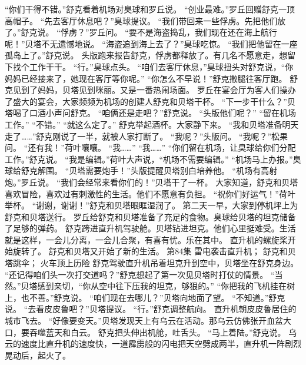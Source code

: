 \documentclass[a4paper,12pt,UTF8,twoside]{ctexbook}
\begin{document}
        “你们干得不错。”舒克看着机场对臭球和罗丘说。 
        “创业最难。”罗丘回赠舒克一顶高帽子。 
        “先去客厅休息吧？”臭球提议。 
        “我们带回来一些俘虏。先把他们放了。”舒克说。 
        “俘虏？”罗丘问。 
        “要不是海盗捣乱，我们现在还在海上航行呢！”贝塔不无遗憾地说。 
        “海盗追到海上去了？”臭球吃惊。 
        “我们把他留在一座孤岛上了。”舒克说。 
        头版跑来报告舒克，俘虏都释放了。有几名不愿意走，想留下找个工作干干。 
        “行。”臭球点头。 
        “咱们去客厅休息，”臭球扭头对舒克说，“你妈妈已经接来了，她现在客厅等你呢。” 
        “你怎么不早说！”舒克撒腿往客厅跑。 
        舒克见到了妈妈，贝塔见到咪丽。又是一番热闹场面。 
        罗丘在宴会厅为客人们操办了盛大的宴会，大家频频为机场的创建人舒克和贝塔干杯。 
        “下一步干什么？”贝塔喝了口酒小声问舒克。 
        “咱俩还是走吧？”舒克说。 
        “头版他们呢？” 
        “留在机场工作。” 
        “不错。” 
        “就这么定了。” 
        舒克举起酒杯。大家静下来。 
        “我和贝塔准备明天走了……”舒克刚说了一半，就被人家打断了。 
        “我呢？”头版问。 
        “我呢？”松果问。 
        “还有我！”荷叶嚷嚷。 
        “我……” 
        “我……” 
        “你们留在机场，让臭球给你们分配工作。”舒克说。 
        “我是编辑。”荷叶大声说，“机场不需要编辑。” 
        “机场马上办报。”臭球给舒克解围。 
        “贝塔需要炮手！”头版提醒贝塔别白培养他。 
        “机场有高射炮。”罗丘说。 
        “我们会经常来看你们的！”贝塔干了一杯。 
        大家知道，舒克和贝塔喜欢冒险，喜欢过有刺激性的生活。他们不愿意有负担。 
        “祝你们好运气！”荷叶举杯。 
        “谢谢，谢谢！”舒克和贝塔眼眶湿润了。 
        第二天一早，大家到停机坪上为舒克和贝塔送行。 
        罗丘给舒克和贝塔准备了充足的食物。臭球给贝塔的坦克储备了足够的弹药。 
        舒克跨进直升机驾驶舱。贝塔钻进坦克。他们心里挺难受。生活就是这样，一会儿分离，一会儿合聚，有喜有忧。乐在其中。 
        直升机的螺旋桨开始旋转了。 
        舒克和贝塔又开始了新的生活。   第84集 
        雷电袭击直升机； 
        舒克和贝塔跳伞； 
        火车顶上历险   
        舒克驾驶直升机吊着坦克升到空中，贝塔坐在舒克身边。 
        “还记得咱们头一次打交道吗？”舒克想起了第一次见贝塔时打仗的情景。 
        “当然。”贝塔感到亲切，“你从空中往下压我的坦克，够狠的。” 
        “你把我的飞机挂在树上，也不善。”舒克说。 
        “咱们现在去哪儿？”贝塔向地面了望。 
        “不知道。”舒克说。 
        “去看皮皮鲁吧？”贝塔提议。 
        “行。”舒克调整航向。 
        直升机朝皮皮鲁居住的城市飞去。 
        “好像要变天。”贝塔发现天上有乌云在活动。那乌云仿佛张开血盆大口，要吞噬蓝天和白云。 
        舒克把头伸出机舱，吐舌头。 
        “马上着陆。”舒克说。 
        乌云的速度比直升机的速度快，一道霹雳般的闪电把天空劈成两半，直升机一阵剧烈晃动后，起火了。 
\end{document}
